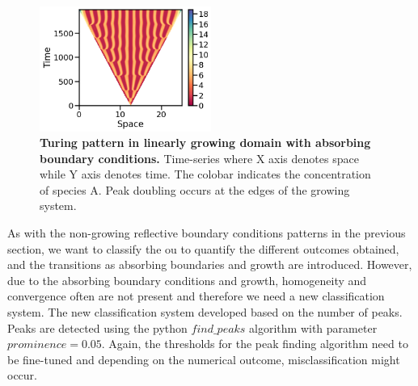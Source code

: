 \begin{figure}[H] %
    \centering
    \begin{adjustbox}{center}
        \includegraphics[width=0.5\textwidth]{chapters/Chapter 1/growing_pattern} %
    \end{adjustbox}
    \caption{\textbf{Turing pattern in linearly growing domain with absorbing boundary conditions.} Time-series where X axis denotes space while Y axis denotes time. The colobar indicates the concentration of species A. Peak doubling occurs at the edges of the growing system.}
    \label{fig:growing_pattern} %
\end{figure}

As with the non-growing reflective boundary conditions patterns in the previous section, we want to classify the ou to quantify the different outcomes obtained, and the transitions as absorbing boundaries and growth are introduced.
However, due to the absorbing boundary conditions and growth, homogeneity and convergence often are not present and therefore we need a new classification system.
The new classification system developed based on the number of peaks.
Peaks are detected using the python $find\_peaks$ algorithm with parameter $prominence=0.05$.
Again, the thresholds for the peak finding algorithm need to be fine-tuned and depending on the numerical outcome, misclassification might occur.


